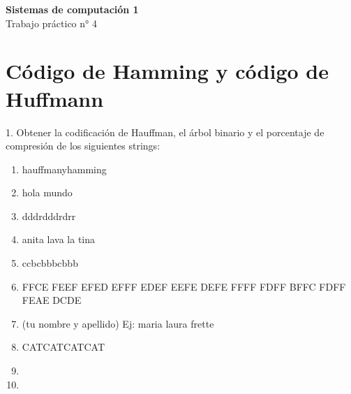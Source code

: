 \documentclass{article}
\begin{document}
	\begin{center}
		
		\LARGE \textbf{Sistemas de computación 1} \\[0.5cm]

		\LARGE Trabajo práctico n° 4 \\
	\end{center}	
	
	\section*{Código de Hamming y código de Huffmann}
	
	1. Obtener la codificación de Hauffman, el árbol binario y el porcentaje de compresión
	de los siguientes strings:
	\begin{enumerate}
	\item hauffmanyhamming
	\item hola mundo
	\item dddrdddrdrr
	\item anita lava la tina
	\item ccbcbbbcbbb
	\item FFCE FEEF EFED EFFF EDEF EEFE DEFE FFFF FDFF BFFC FDFF FEAE DCDE
	\item (tu nombre y apellido) Ej: maria laura frette
	\item CATCATCATCAT
	\item {}
	\item {} 
	\end{enumerate}
\end{document}
